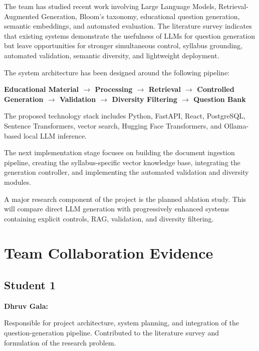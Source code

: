 \documentclass[12pt,a4paper]{report}
\begin{document}
The team has studied recent work involving Large Language Models, Retrieval-Augmented Generation, Bloom's taxonomy, educational question generation, semantic embeddings, and automated evaluation. The literature survey indicates that existing systems demonstrate the usefulness of LLMs for question generation but leave opportunities for stronger simultaneous control, syllabus grounding, automated validation, semantic diversity, and lightweight deployment.

The system architecture has been designed around the following pipeline:

\begin{center}
\textbf{
Educational Material
$\rightarrow$
Processing
$\rightarrow$
Retrieval
$\rightarrow$
Controlled Generation
$\rightarrow$
Validation
$\rightarrow$
Diversity Filtering
$\rightarrow$
Question Bank
}
\end{center}

The proposed technology stack includes Python, FastAPI, React, PostgreSQL, Sentence Transformers, vector search, Hugging Face Transformers, and Ollama-based local LLM inference.

The next implementation stage focuses on building the document ingestion pipeline, creating the syllabus-specific vector knowledge base, integrating the generation controller, and implementing the automated validation and diversity modules.

A major research component of the project is the planned ablation study. This will compare direct LLM generation with progressively enhanced systems containing explicit controls, RAG, validation, and diversity filtering.


\chapter*{Team Collaboration Evidence}

\section*{Student 1}

\textbf{Dhruv Gala:}

Responsible for project architecture, system planning, and integration of the question-generation pipeline. Contributed to the literature survey and formulation of the research problem.
\end{document}
